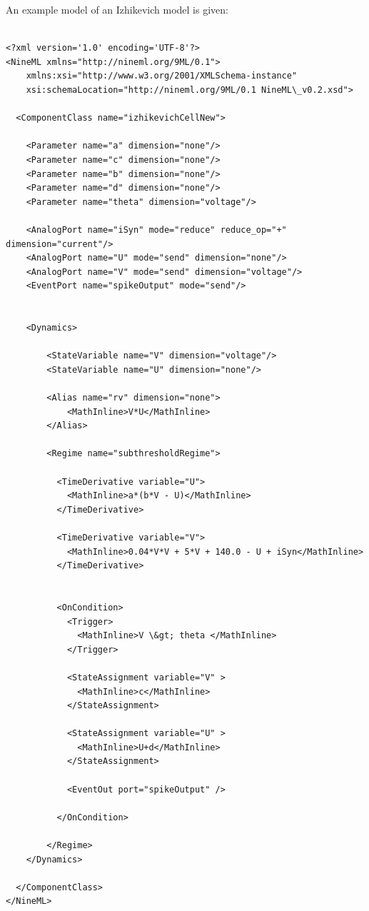 \documentclass[a4paper,english]{article}
\begin{document}
An example model of an Izhikevich model is given:
%
\begin{lstlisting}

<?xml version='1.0' encoding='UTF-8'?>
<NineML xmlns="http://nineml.org/9ML/0.1">
    xmlns:xsi="http://www.w3.org/2001/XMLSchema-instance"
    xsi:schemaLocation="http://nineml.org/9ML/0.1 NineML\_v0.2.xsd">
 
  <ComponentClass name="izhikevichCellNew">
 
    <Parameter name="a" dimension="none"/>
    <Parameter name="c" dimension="none"/>
    <Parameter name="b" dimension="none"/>
    <Parameter name="d" dimension="none"/>
    <Parameter name="theta" dimension="voltage"/>
 
    <AnalogPort name="iSyn" mode="reduce" reduce_op="+" dimension="current"/>
    <AnalogPort name="U" mode="send" dimension="none"/>
    <AnalogPort name="V" mode="send" dimension="voltage"/>
    <EventPort name="spikeOutput" mode="send"/>
 
 
    <Dynamics>
 
        <StateVariable name="V" dimension="voltage"/>
        <StateVariable name="U" dimension="none"/>
 
        <Alias name="rv" dimension="none">
            <MathInline>V*U</MathInline>
        </Alias>
 
        <Regime name="subthresholdRegime">
 
          <TimeDerivative variable="U">
            <MathInline>a*(b*V - U)</MathInline>
          </TimeDerivative>
 
          <TimeDerivative variable="V">
            <MathInline>0.04*V*V + 5*V + 140.0 - U + iSyn</MathInline>
          </TimeDerivative>
 
 
          <OnCondition>
            <Trigger>
              <MathInline>V \&gt; theta </MathInline>
            </Trigger>
 
            <StateAssignment variable="V" >
              <MathInline>c</MathInline>
            </StateAssignment>
 
            <StateAssignment variable="U" >
              <MathInline>U+d</MathInline>
            </StateAssignment>
 
            <EventOut port="spikeOutput" />
 
          </OnCondition>
 
        </Regime>
    </Dynamics>
 
  </ComponentClass>
</NineML>
\end{lstlisting}
\end{document}
